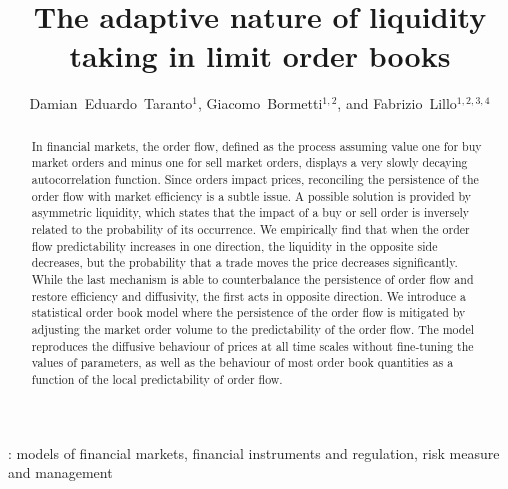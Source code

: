 \documentclass[12pt]{iopart}
\begin{document}
\title{The adaptive nature of liquidity taking in limit order books}
\author{Damian~Eduardo~Taranto$^1$, Giacomo~Bormetti$^{1,2}$, and Fabrizio~Lillo$^{1,2,3,4}$}

\address{$^1$ Scuola Normale Superiore, Piazza dei Cavalieri 7, Pisa, 56126, Italy}
\address{$^2$ QUANTLab, via Pietrasantina 123, Pisa, 56122, Italy}
\address{$^3$ Dipartimento di Fisica e Chimica, Universit{\`a} degli Studi di Palermo, Viale delle Scienze Ed. 18, Palermo, 90128, Italy}
\address{$^4$ Santa Fe Institute, 1399 Hyde Park Road, Santa Fe, NM 87501, USA}

\begin{abstract}
In financial markets, the order flow, defined as the process assuming value one for buy market orders and minus one for sell market orders, displays a very slowly decaying autocorrelation function. Since orders impact prices, reconciling the persistence of the order flow with market efficiency is a subtle issue. A possible solution is provided by asymmetric liquidity, which states that the impact of a buy or sell order is inversely related to the probability of its occurrence. We empirically find that when the order flow predictability increases in one direction, the liquidity in the opposite side decreases, but the probability that a trade moves the price decreases significantly. While the last mechanism is able to counterbalance the persistence of order flow and restore efficiency and diffusivity, the first acts in opposite direction. We introduce a statistical order book model where the persistence of the order flow is mitigated by adjusting the market order volume to the predictability of the order flow. The model reproduces the diffusive behaviour of prices at all time scales without fine-tuning the values of parameters, as well as the behaviour of most order book quantities as a function of the local predictability of order flow.
\end{abstract}


: models of financial markets, financial instruments and regulation, risk measure and management

\maketitle
\end{document}
